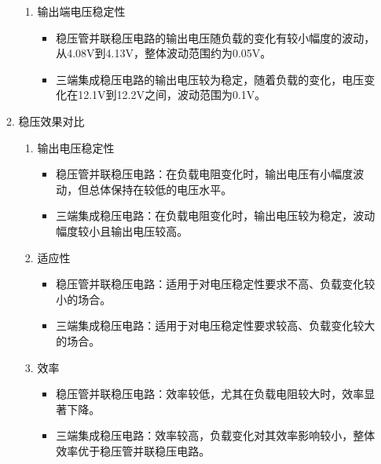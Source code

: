 \documentclass[dvipsnames, svgnames,a4paper,11pt]{article}
\begin{document}
\begin{enumerate}
\begin{enumerate}
\begin{enumerate}
							\item 输出端电压稳定性
								\begin{itemize}
									\item 稳压管并联稳压电路的输出电压随负载的变化有较小幅度的波动，从4.08V到4.13V，整体波动范围约为0.05V。
									\item 三端集成稳压电路的输出电压较为稳定，随着负载的变化，电压变化在12.1V到12.2V之间，波动范围为0.1V。
								\end{itemize}
							

						\end{enumerate}
				
					\item 稳压效果对比
						\begin{enumerate}
							\item 输出电压稳定性
								\begin{itemize}
									\item 稳压管并联稳压电路：在负载电阻变化时，输出电压有小幅度波动，但总体保持在较低的电压水平。
									\item 三端集成稳压电路：在负载电阻变化时，输出电压较为稳定，波动幅度较小且输出电压较高。
								\end{itemize}
							
							\item 适应性
								\begin{itemize}
									\item 稳压管并联稳压电路：适用于对电压稳定性要求不高、负载变化较小的场合。
									\item 三端集成稳压电路：适用于对电压稳定性要求较高、负载变化较大的场合。
								\end{itemize}
							
							\item 效率
								\begin{itemize}
									\item 稳压管并联稳压电路：效率较低，尤其在负载电阻较大时，效率显著下降。
									\item 三端集成稳压电路：效率较高，负载变化对其效率影响较小，整体效率优于稳压管并联稳压电路。
								\end{itemize}
						\end{enumerate}
					

\end{enumerate}
\end{enumerate}
\end{document}
